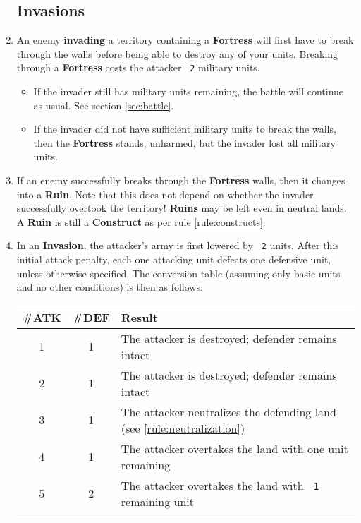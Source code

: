 \documentclass[10pt,openright,a4paper,openany]{article}
\newcommand{\num}[1]{\texttt{\color{purple} {#1}}}
\newcommand{\term}[1]{\textbf{\color{purple} #1}}
\newcommand{\fortress}{\term{Fortress}}
\begin{document}
\begin{enumerate}
	\subsection*{Invasions}\item An enemy \term{invading} a territory containing a \fortress{} will first have to break through the walls before being able to destroy any of your units. Breaking through a \fortress{} costs the attacker \num{2} military units.
	\begin{itemize}
		\item If the invader still has military units remaining, the battle will continue as usual. See section \ref{sec:battle}.
		\item If the invader did not have sufficient military units to break the walls, then the \fortress{} stands, unharmed, but the invader lost all military units.
	\end{itemize}
\item If an enemy successfully breaks through the \fortress{} walls, then it changes into a \term{Ruin}. Note that this does not depend on whether the invader successfully overtook the territory! \term{Ruins} may be left even in neutral lands. A \term{Ruin} is still a \term{Construct} as per rule \ref{rule:constructs}.
	\item In an \term{Invasion}, the attacker's army is first lowered by \num{2} units. After this initial attack penalty, each one attacking unit defeats one defensive unit, unless otherwise specified. The conversion table (assuming only basic units and no other conditions) is then as follows:\par
	\begin{tabular}{c|c|l}
		\textbf{\#ATK} & \textbf{\#DEF} & \textbf{Result}  \\\hline
		1 & 1 & The attacker is destroyed; defender remains intact \\
		2 & 1 & The attacker is destroyed; defender remains intact \\
		3 & 1 & The attacker neutralizes the defending land (see \ref{rule:neutralization}) \\
		4 & 1 & The attacker overtakes the land with one unit remaining \\
		5 & 2 & The attacker overtakes the land with \num{1} remaining unit \\{}

\end{tabular}
\end{enumerate}
\end{document}
